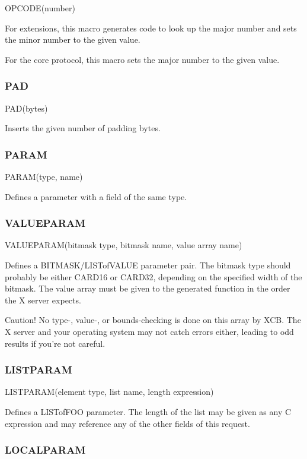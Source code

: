 \documentclass[english]{article}
\begin{document}
OPCODE(number)

For extensions, this macro generates code to look up the major number
and sets the minor number to the given value.

For the core protocol, this macro sets the major number to the given
value.


\subsubsection{PAD}

PAD(bytes)

Inserts the given number of padding bytes.


\subsubsection{PARAM}

PARAM(type, name)

Defines a parameter with a field of the same type.


\subsubsection{VALUEPARAM}

VALUEPARAM(bitmask type, bitmask name, value array name)

Defines a BITMASK/LISTofVALUE parameter pair. The bitmask type should
probably be either CARD16 or CARD32, depending on the specified width
of the bitmask. The value array must be given to the generated function
in the order the X server expects.

Caution! No type-, value-, or bounds-checking is done on this array by
XCB. The X server and your operating system may not catch errors either,
leading to odd results if you're not careful.


\subsubsection{LISTPARAM}

LISTPARAM(element type, list name, length expression)

Defines a LISTofFOO parameter. The length of the list may be given
as any C expression and may reference any of the other fields of this
request.


\subsubsection{LOCALPARAM}
\end{document}
